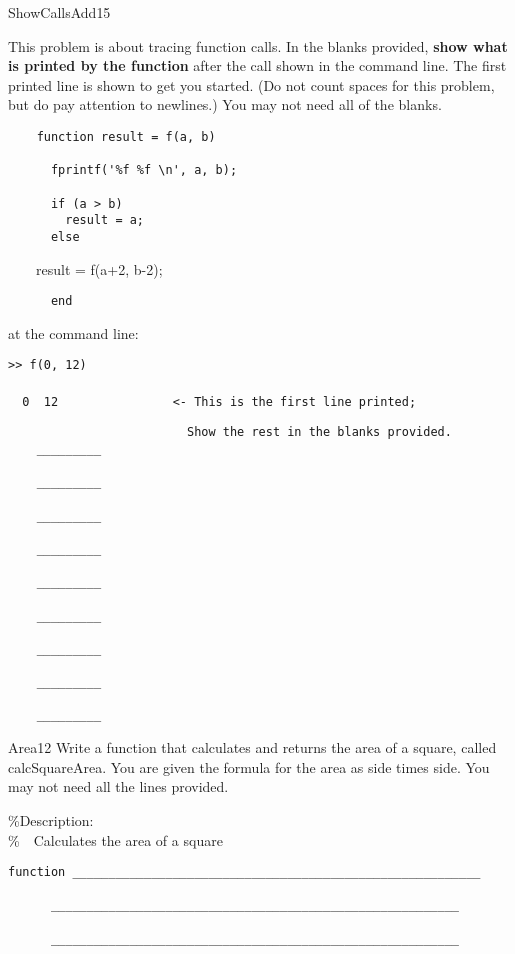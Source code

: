 \documentclass[master]{exam}
\begin{document}
\begin{problem}[require=careful]{ShowCallsAdd}{15}

    This problem is about tracing function calls. In the blanks provided,
    \textbf{show what is printed by the function} after the call shown in the
    command line. The first printed line is shown to get you started. (Do not count spaces for this problem, but do pay attention to newlines.) You may not need all of the blanks.
    \begin{verbatim}
    function result = f(a, b)
      
      fprintf('%f %f \n', a, b);
      
      if (a > b)
        result = a;
      else\end{verbatim}
    \ \ \ \ result = f(a+2, b-2);
    \begin{verbatim}
      end
    \end{verbatim}

    at the command line:

    \texttt{>> f(0, 12)\\
    \\%
    \ \ 0 \ 12\ \ \ \ \ \ \ \ \ \ \ \ \ \ \ \ <- This is the first line printed;}
    \begin{verbatim}
                         Show the rest in the blanks provided.
    _________

    _________

    _________

    _________

    _________

    _________

    _________

    _________

    _________
    \end{verbatim}
\end{problem}


\begin{problem}{Area}{12}
    \label{ca1} Write a function that
    calculates and returns the area of
    a square,
    called calcSquareArea. You
    are given the formula for the area as side times
    side. You may not
    need all the lines provided.

    \%Description:\\
    \%\ \ Calculates the area of a square
    \begin{verbatim}function _________________________________________________________

      _________________________________________________________

      _________________________________________________________
    \end{verbatim}
\end{problem}
\end{document}
